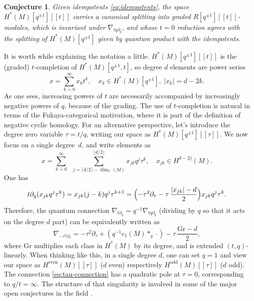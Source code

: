 \documentclass[10pt,a4paper]{amsart}
\newcommand{\llbracket}{[\![}
\newcommand{\rrbracket}{]\!]}
\theoremstyle{plain}
\newtheorem{conjecture}[theorem]{Conjecture}
\theoremstyle{definition}
\newcommand{\bC}{{\mathbb C}}
\begin{document}
\begin{conjecture} \label{th:splitting-conjecture}
Given idempotents \eqref{eq:idempotents}, the space $H^*(M)[q^{\pm 1}]\llbracket t\rrbracket$ carries a canonical splitting into graded $R[q^{\pm 1}]\llbracket t\rrbracket$-modules, which is invariant under $\nabla_{tq\partial_q}$, and whose $t = 0$ reduction agrees with the splitting of $H^*(M)[q^{\pm 1}]$ given by quantum product with the idempotents.
\end{conjecture}

It is worth while explaining the notation a little. $H^*(M)[q^{\pm 1}]\llbracket t\rrbracket$ is the (graded) $t$-completion of $H^*(M)[q^{\pm 1},t]$, so degree $d$ elements are power series
\begin{equation*}
x = \sum_{k=0}^\infty x_k t^k, \quad x_k \in H^*(M)[q^{\pm 1}], \; |x_k| = d-2k.
\end{equation*}
As one sees, increasing powers of $t$ are necessarily accompanied by increasingly negative powers of $q$, because of the grading. The use of $t$-completion is natural in terms of the Fukaya-categorical motivation, where it is part of the definition of negative cyclic homology. For an alternative perspective, let's introduce the degree zero variable $\tau = t/q$, writing our space as $H^*(M)[q^{\pm 1}]\llbracket \tau\rrbracket$. We now focus on a single degree~$d$, and write elements as
\begin{equation*}
x = \sum_{k=0}^\infty \;\; \sum_{j = \lceil d/2 \rceil - \dim_{\bC}(M)}^{\lfloor d/2 \rfloor} x_{jk} q^j \tau^k, \quad x_{jk} \in H^{d-2j}(M).
\end{equation*}
One has
\begin{equation*}
t\partial_q (x_{jk} q^j \tau^k) = x_{jk} (j-k)q^j \tau^{k+1} = \Bigl(-\tau^2\partial_\tau - \tau\, \frac{|x_{jk}|-d}{2}\Bigr) x_{jk} q^j \tau^k.
\end{equation*}
Therefore, the quantum connection $\nabla_{t\partial_q} = q^{-1}\nabla_{tq\partial_q}$ (dividing by $q$ so that it acts on the degree $d$ part) can be equivalently written as
\begin{equation}\label{eq:tau-connection}
\nabla_{-\tau^2\partial_\tau} = -\tau^2 \partial_\tau + (q^{-1} c_1(M) \ast_q \cdot) - \tau\, \frac{\mathrm{Gr}-d}{2},
\end{equation}
where $\mathrm{Gr}$ multiplies each class in $H^*(M)$ by its degree, and is extended $(t,q)$-linearly. When thinking like this, in a single degree $d$, one can set $q = 1$ and view our space as $H^{\mathrm{even}}(M)\llbracket \tau\rrbracket$ ($d$ even) respectively $H^{\mathrm{odd}}(M)\llbracket \tau\rrbracket$ ($d$ odd). The connection \eqref{eq:tau-connection} has a quadratic pole at $\tau = 0$, corresponding to $q/t = \infty$. The structure of that singularity is involved in some of the major open conjectures in the field \cite{dubrovin98, katzarkov-kontsevich-pantev08, galkin-golyshev-iritani16}.
\end{document}
